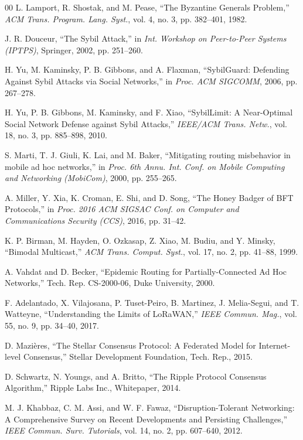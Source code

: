 \documentclass[conference]{IEEEtran}
\begin{document}
\begin{thebibliography}{00}
L. Lamport, R. Shostak, and M. Pease, ``The Byzantine Generals Problem,'' \textit{ACM Trans. Program. Lang. Syst.}, vol. 4, no. 3, pp. 382--401, 1982.

J. R. Douceur, ``The Sybil Attack,'' in \textit{Int. Workshop on Peer-to-Peer Systems (IPTPS)}, Springer, 2002, pp. 251--260.

H. Yu, M. Kaminsky, P. B. Gibbons, and A. Flaxman, ``SybilGuard: Defending Against Sybil Attacks via Social Networks,'' in \textit{Proc. ACM SIGCOMM}, 2006, pp. 267--278.

H. Yu, P. B. Gibbons, M. Kaminsky, and F. Xiao, ``SybilLimit: A Near-Optimal Social Network Defense against Sybil Attacks,'' \textit{IEEE/ACM Trans. Netw.}, vol. 18, no. 3, pp. 885--898, 2010.

S. Marti, T. J. Giuli, K. Lai, and M. Baker, ``Mitigating routing misbehavior in mobile ad hoc networks,'' in \textit{Proc. 6th Annu. Int. Conf. on Mobile Computing and Networking (MobiCom)}, 2000, pp. 255--265.

A. Miller, Y. Xia, K. Croman, E. Shi, and D. Song, ``The Honey Badger of BFT Protocols,'' in \textit{Proc. 2016 ACM SIGSAC Conf. on Computer and Communications Security (CCS)}, 2016, pp. 31--42.

K. P. Birman, M. Hayden, O. Ozkasap, Z. Xiao, M. Budiu, and Y. Minsky, ``Bimodal Multicast,'' \textit{ACM Trans. Comput. Syst.}, vol. 17, no. 2, pp. 41--88, 1999.

A. Vahdat and D. Becker, ``Epidemic Routing for Partially-Connected Ad Hoc Networks,'' Tech. Rep. CS-2000-06, Duke University, 2000.

F. Adelantado, X. Vilajosana, P. Tuset-Peiro, B. Martinez, J. Melia-Segui, and T. Watteyne, ``Understanding the Limits of LoRaWAN,'' \textit{IEEE Commun. Mag.}, vol. 55, no. 9, pp. 34--40, 2017.

D. Mazi\`eres, ``The Stellar Consensus Protocol: A Federated Model for Internet-level Consensus,'' Stellar Development Foundation, Tech. Rep., 2015.

D. Schwartz, N. Youngs, and A. Britto, ``The Ripple Protocol Consensus Algorithm,'' Ripple Labs Inc., Whitepaper, 2014.

M. J. Khabbaz, C. M. Assi, and W. F. Fawaz, ``Disruption-Tolerant Networking: A Comprehensive Survey on Recent Developments and Persisting Challenges,'' \textit{IEEE Commun. Surv. Tutorials}, vol. 14, no. 2, pp. 607--640, 2012.


\end{thebibliography}
\end{document}
